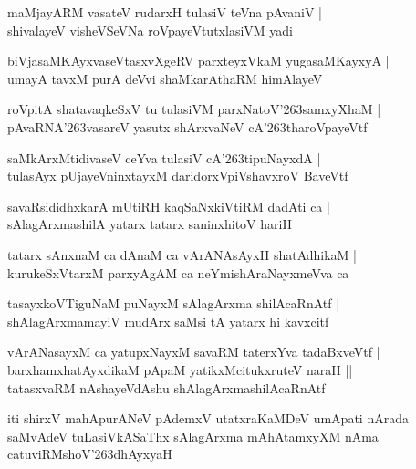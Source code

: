 \documentclass[twoside,12pt,openright]{book}
\def\S{\char'263}
\newcounter{shloka}[chapter]
\begin{document}
\begin{shloka}%
maMjayARM vasateV rudarxH tulasiV teVna pAvaniV |\\
shivalayeV visheVSeVNa roVpayeVtutxlasiVM yadi 
\end{shloka}

\begin{shloka}%
biVjasaMKAyxvaseVtasxvXgeRV parxteyxVkaM yugasaMKayxyA |\\
umayA tavxM purA deVvi shaMkarAthaRM himAlayeV 
\end{shloka}

\begin{shloka}%
roVpitA shatavaqkeSxV tu tulasiVM parxNatoV\S samxyXhaM |\\
pAvaRNA\S vasareV yasutx shArxvaNeV cA\S tharoVpayeVtf 
\end{shloka}

\begin{shloka}%
saMkArxMtidivaseV ceYva tulasiV cA\S tipuNayxdA |\\
tulasAyx pUjayeVninxtayxM daridorxVpiVshavxroV BaveVtf
\end{shloka}

\begin{shloka}%
savaRsididhxkarA mUtiRH kaqSaNxkiVtiRM dadAti ca |\\
sAlagArxmashilA yatarx tatarx saninxhitoV hariH 
\end{shloka}

\begin{shloka}%
tatarx sAnxnaM ca dAnaM ca vArANAsAyxH shatAdhikaM |\\
kurukeSxVtarxM parxyAgAM ca neYmishAraNayxmeVva ca 
\end{shloka}

\begin{shloka}%
tasayxkoVTiguNaM puNayxM sAlagArxma shilAcaRnAtf |\\
shAlagArxmamayiV mudArx saMsi tA yatarx hi kavxcitf
\end{shloka}

\begin{shloka}%
vArANasayxM ca yatupxNayxM savaRM taterxYva tadaBxveVtf |\\
barxhamxhatAyxdikaM pApaM yatikxMcitukxruteV naraH ||\\
tatasxvaRM nAshayeVdAshu shAlagArxmashilAcaRnAtf
\end{shloka}

\begin{center}
iti shirxV mahApurANeV pAdemxV utatxraKaMDeV  umApati nArada saMvAdeV  
tuLasiVkASaThx sAlagArxma mAhAtamxyXM nAma catuviRMshoV\S dhAyxyaH 
\end{center}
\end{document}
